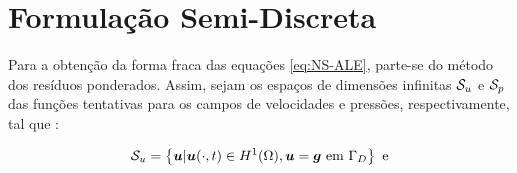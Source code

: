 % 
% 

\section{Formulação Semi-Discreta} \label{FSD}

Para a obtenção da forma fraca das equações \eqref{eq:NS-ALE}, parte-se do método dos resíduos ponderados. Assim, sejam os espaços de dimensões infinitas $\mathcal{S}_u$ e $\mathcal{S}_p$ das funções tentativas para os campos de velocidades e pressões, respectivamente, tal que \cite{bazilevs2013computational,fernandes2020tecnica}:

\begin{equation}
    \mathcal{S}_u=\left\{\boldsymbol{u}|\boldsymbol{u}(\cdot,t)\in H^1(\Omega),\boldsymbol{u}=\boldsymbol{g}\text{ em }\Gamma_D\right\}\text{ e}
\end{equation}

